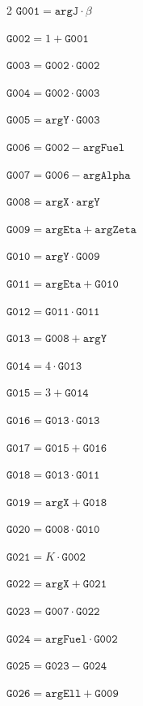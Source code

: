 \documentclass[10pt]{article}
\begin{document}
\begin{multicols}{2}\fontsize{8}{9}\selectfont
\noindent $\mathtt{G001}=\mathtt{argJ}\cdot \beta$\par
\noindent $\mathtt{G002}=1+\mathtt{G001}$\par
\noindent $\mathtt{G003}=\mathtt{G002}\cdot \mathtt{G002}$\par
\noindent $\mathtt{G004}=\mathtt{G002}\cdot \mathtt{G003}$\par
\noindent $\mathtt{G005}=\mathtt{argY}\cdot \mathtt{G003}$\par
\noindent $\mathtt{G006}=\mathtt{G002}-\mathtt{argFuel}$\par
\noindent $\mathtt{G007}=\mathtt{G006}-\mathtt{argAlpha}$\par
\noindent $\mathtt{G008}=\mathtt{argX}\cdot \mathtt{argY}$\par
\noindent $\mathtt{G009}=\mathtt{argEta}+\mathtt{argZeta}$\par
\noindent $\mathtt{G010}=\mathtt{argY}\cdot \mathtt{G009}$\par
\noindent $\mathtt{G011}=\mathtt{argEta}+\mathtt{G010}$\par
\noindent $\mathtt{G012}=\mathtt{G011}\cdot \mathtt{G011}$\par
\noindent $\mathtt{G013}=\mathtt{G008}+\mathtt{argY}$\par
\noindent $\mathtt{G014}=4\cdot \mathtt{G013}$\par
\noindent $\mathtt{G015}=3+\mathtt{G014}$\par
\noindent $\mathtt{G016}=\mathtt{G013}\cdot \mathtt{G013}$\par
\noindent $\mathtt{G017}=\mathtt{G015}+\mathtt{G016}$\par
\noindent $\mathtt{G018}=\mathtt{G013}\cdot \mathtt{G011}$\par
\noindent $\mathtt{G019}=\mathtt{argX}+\mathtt{G018}$\par
\noindent $\mathtt{G020}=\mathtt{G008}\cdot \mathtt{G010}$\par
\noindent $\mathtt{G021}=K\cdot \mathtt{G002}$\par
\noindent $\mathtt{G022}=\mathtt{argX}+\mathtt{G021}$\par
\noindent $\mathtt{G023}=\mathtt{G007}\cdot \mathtt{G022}$\par
\noindent $\mathtt{G024}=\mathtt{argFuel}\cdot \mathtt{G002}$\par
\noindent $\mathtt{G025}=\mathtt{G023}-\mathtt{G024}$\par
\noindent $\mathtt{G026}=\mathtt{argEll}+\mathtt{G009}$\par

\end{multicols}
\end{document}
